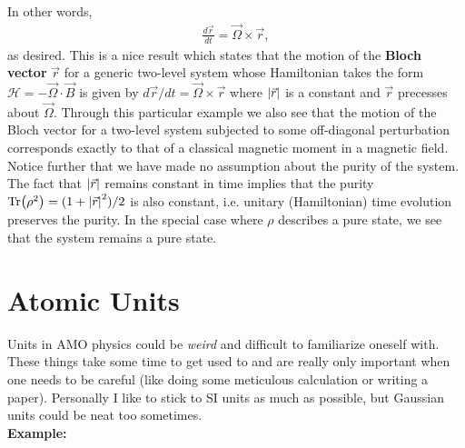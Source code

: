 \documentclass{book}
\theoremstyle{definition}
\newcommand{\ham}{\mathcal{H}}
\newcommand{\f}[2]{\frac{#1}{#2}}
\begin{document}
In other words, 
\begin{align*}
	\f{d\vec{r}}{dt} = \vec{\Omega} \times \vec{r},
\end{align*}
as desired. This is a nice result which states that the motion of the \textbf{Bloch vector} $\vec{r}$ for a generic two-level system whose Hamiltonian takes the form $\ham = - \vec{\Omega} \cdot \vec{B}$ is given by $d\vec{r}/dt = \vec{\Omega}\times \vec{r}$ where $\abs{\vec{r}}$ is a constant and $\vec{r}$ precesses about $\vec{\Omega}$. Through this particular example we also see that the motion of the Bloch vector for a two-level system subjected to some off-diagonal perturbation corresponds exactly to that of a classical magnetic moment in a magnetic field. \\


Notice further that we have made no assumption about the purity of the system. The fact that $\abs{\vec{r}}$ remains constant in time implies that the purity $\Tr(\rho^2) = (1 + \abs{\vec{r}}^2)/2$ is also constant, i.e. unitary (Hamiltonian) time evolution preserves the purity. In the special case where $\rho$ describes a pure state, we see  that the system remains a pure state. 











\section{Atomic Units}



Units in AMO physics could be \textit{weird} and difficult to familiarize oneself with. These things take some time to get used to and are really only important when one needs to be careful (like doing some meticulous calculation or writing a paper). Personally I like to stick to SI units as much as possible, but Gaussian units could be neat too sometimes. \\





\noindent \textbf{Example:}
\end{document}

